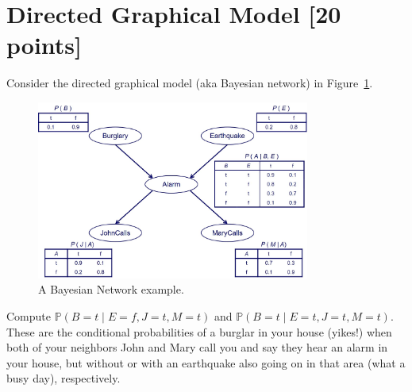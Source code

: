 \documentclass[a4paper]{article}
\theoremstyle{definition}
\begin{document}
	\section{Directed Graphical Model [20 points]}
	Consider the directed graphical model (aka Bayesian network) in Figure~\ref{fig:bn}.
	\begin{figure}[H]
		\centering
		\includegraphics[width=0.8\textwidth]{BN.jpg}
		\caption{A Bayesian Network example.}
		\label{fig:bn}
	\end{figure}
	Compute $\mathbb{P}(B=t \mid E=f,J=t,M=t)$ and $\mathbb{P}(B=t \mid E=t,J=t,M=t)$.
	These are the conditional probabilities of a burglar in your house (yikes!) when both of your neighbors John and Mary call you and say they hear an alarm in your house, but without or with an earthquake also going on in that area (what a busy day), respectively.
	
	
\end{document}
